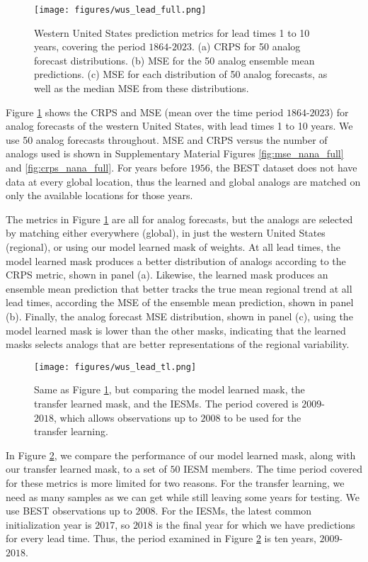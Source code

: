 \begin{figure}[h!]
    \centering
    \noindent\texttt{[image: figures/wus\_lead\_full.png]}
    \caption{Western United States prediction metrics for lead times 1 to 10 years, covering the period $1864$-$2023$.
    (a) CRPS for 50 analog forecast distributions.
    (b) MSE for the 50 analog ensemble mean predictions.
    (c) MSE for each distribution of 50 analog forecasts, as well as the median MSE from these distributions.
    }
    \label{fig:metrics_wus_full}
\end{figure}

Figure \ref{fig:metrics_wus_full} shows the CRPS and MSE (mean over the time period $1864$-$2023$) for analog forecasts of the western United States, with lead times 1 to 10 years.
We use 50 analog forecasts throughout.
MSE and CRPS versus the number of analogs used is shown in Supplementary Material Figures \ref{fig:mse_nana_full} and \ref{fig:crps_nana_full}.
For years before $1956$, the BEST dataset does not have data at every global location, thus the learned and global analogs are matched on only the available locations for those years.

The metrics in Figure \ref{fig:metrics_wus_full} are all for analog forecasts, but the analogs are selected by matching either everywhere (global), in just the western United States (regional), or using our model learned mask of weights.
At all lead times, the model learned mask produces a better distribution of analogs according to the CRPS metric, shown in panel (a).
Likewise, the learned mask produces an ensemble mean prediction that better tracks the true mean regional trend at all lead times, according the MSE of the ensemble mean prediction, shown in panel (b).
Finally, the analog forecast MSE distribution, shown in panel (c), using the model learned mask is lower than the other masks, indicating that the learned masks selects analogs that are better representations of the regional variability.

\begin{figure}[h!]
    \centering
    \noindent\texttt{[image: figures/wus\_lead\_tl.png]}
    \caption{Same as Figure \ref{fig:metrics_wus_full}, but comparing the model learned mask, the transfer learned mask, and the IESMs.
    The period covered is $2009$-$2018$, which allows observations up to $2008$ to be used for the transfer learning.
    }
    \label{fig:metrics_wus_tl}
\end{figure}

In Figure \ref{fig:metrics_wus_tl}, we compare the performance of our model learned mask, along with our transfer learned mask, to a set of $50$ IESM members.
The time period covered for these metrics is more limited for two reasons.
For the transfer learning, we need as many samples as we can get while still leaving some years for testing.
We use BEST observations up to $2008$.
For the IESMs, the latest common initialization year is $2017$, so $2018$ is the final year for which we have predictions for every lead time.
Thus, the period examined in Figure \ref{fig:metrics_wus_tl} is ten years, $2009$-$2018$.

